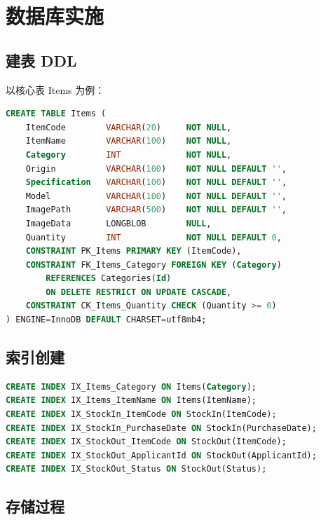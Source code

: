 \documentclass[12pt,a4paper]{ctexart}
\begin{document}
\section{数据库实施}

\subsection{建表 DDL}

以核心表 Items 为例：

\begin{lstlisting}[language=SQL,caption=Items 表建表语句]
CREATE TABLE Items (
    ItemCode        VARCHAR(20)     NOT NULL,
    ItemName        VARCHAR(100)    NOT NULL,
    Category        INT             NOT NULL,
    Origin          VARCHAR(100)    NOT NULL DEFAULT '',
    Specification   VARCHAR(100)    NOT NULL DEFAULT '',
    Model           VARCHAR(100)    NOT NULL DEFAULT '',
    ImagePath       VARCHAR(500)    NOT NULL DEFAULT '',
    ImageData       LONGBLOB        NULL,
    Quantity        INT             NOT NULL DEFAULT 0,
    CONSTRAINT PK_Items PRIMARY KEY (ItemCode),
    CONSTRAINT FK_Items_Category FOREIGN KEY (Category)
        REFERENCES Categories(Id)
        ON DELETE RESTRICT ON UPDATE CASCADE,
    CONSTRAINT CK_Items_Quantity CHECK (Quantity >= 0)
) ENGINE=InnoDB DEFAULT CHARSET=utf8mb4;
\end{lstlisting}

\subsection{索引创建}

\begin{lstlisting}[language=SQL,caption=索引创建语句]
CREATE INDEX IX_Items_Category ON Items(Category);
CREATE INDEX IX_Items_ItemName ON Items(ItemName);
CREATE INDEX IX_StockIn_ItemCode ON StockIn(ItemCode);
CREATE INDEX IX_StockIn_PurchaseDate ON StockIn(PurchaseDate);
CREATE INDEX IX_StockOut_ItemCode ON StockOut(ItemCode);
CREATE INDEX IX_StockOut_ApplicantId ON StockOut(ApplicantId);
CREATE INDEX IX_StockOut_Status ON StockOut(Status);
\end{lstlisting}

\subsection{存储过程}
\end{document}

